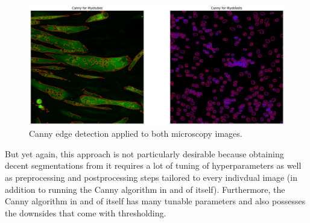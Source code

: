\begin{figure}
	\centering
	\includegraphics[width=\textwidth]{"images/canny.png"}
	\caption{Canny edge detection applied to both microscopy images.}
	\label{figcanny}
\end{figure}

But yet again, this approach is not particularly desirable because obtaining decent segmentations from it requires a lot of tuning of hyperparameters as well as preprocessing and postprocessing steps tailored to every indivdual image (in addition to running the Canny algorithm in and of itself). Furthermore, the Canny algorithm in and of itself has many tunable parameters and also possesses the downsides that come with thresholding.
\newpage
